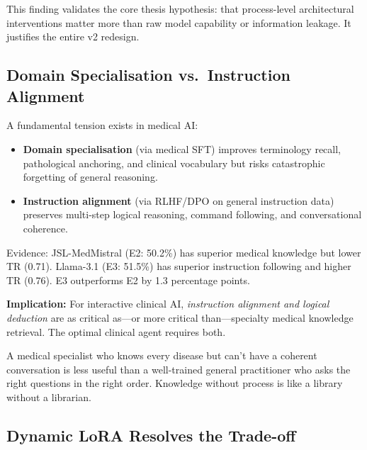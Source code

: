 \begin{mattersbox}[\textcolor{white}{Why It Matters for This Thesis}]
This finding validates the core thesis hypothesis: that process-level architectural interventions matter more than raw model capability or information leakage. It justifies the entire v2 redesign.
\end{mattersbox}

\subsection{Domain Specialisation vs.\ Instruction Alignment}

\begin{acadbox}[\textcolor{white}{Academic Definition}]
A fundamental tension exists in medical AI:
\begin{itemize}
    \item \textbf{Domain specialisation} (via medical SFT) improves terminology recall, pathological anchoring, and clinical vocabulary but risks catastrophic forgetting of general reasoning.
    \item \textbf{Instruction alignment} (via RLHF/DPO on general instruction data) preserves multi-step logical reasoning, command following, and conversational coherence.
\end{itemize}

Evidence: JSL-MedMistral (E2: 50.2\%) has superior medical knowledge but lower TR (0.71). Llama-3.1 (E3: 51.5\%) has superior instruction following and higher TR (0.76). E3 outperforms E2 by 1.3 percentage points.

\textbf{Implication:} For interactive clinical AI, \textit{instruction alignment and logical deduction} are as critical as---or more critical than---specialty medical knowledge retrieval. The optimal clinical agent requires both.
\end{acadbox}

\begin{analogybox}[\textcolor{white}{Simple Analogy}]
A medical specialist who knows every disease but can't have a coherent conversation is less useful than a well-trained general practitioner who asks the right questions in the right order. Knowledge without process is like a library without a librarian.
\end{analogybox}

\subsection{Dynamic LoRA Resolves the Trade-off}

